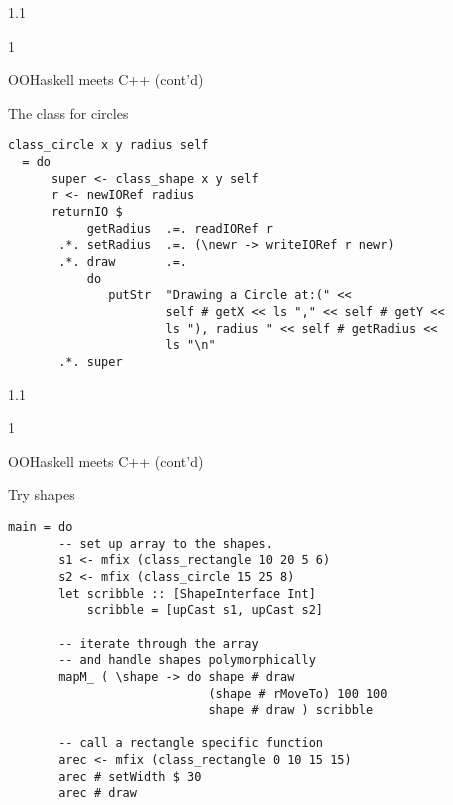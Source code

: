 \documentclass{slides}
\newenvironment{myslide}{\begin{slide}\color{Blue}\begin{boxedminipage}{1.1\hsize}\begin{boxedminipage}{1\hsize}\color{Black}
\vspace{-170\in}
}{%
\smallskip
\end{boxedminipage}
\end{boxedminipage}
\end{slide}}
\newenvironment{myslide}{\begin{slide}
}{%
\end{slide}}
\newenvironment{myslide}{\begin{slide}\color{White}\begin{boxedminipage}{1.1\hsize}\color{Black}
\vspace{-170\in}
}{%
\smallskip
\end{boxedminipage}
\end{slide}}
\newcommand{\header}[1]{{\large \color{Red} #1}}
\begin{document}
\begin{myslide}

\header{OOHaskell meets C++ (cont'd)}

The class for circles

{\tiny

\begin{verbatim}
class_circle x y radius self
  = do
      super <- class_shape x y self
      r <- newIORef radius
      returnIO $
           getRadius  .=. readIORef r
       .*. setRadius  .=. (\newr -> writeIORef r newr)
       .*. draw       .=. 
           do
              putStr  "Drawing a Circle at:(" <<
                      self # getX << ls "," << self # getY <<
                      ls "), radius " << self # getRadius <<
                      ls "\n"
       .*. super
\end{verbatim}

}

\end{myslide}






\begin{myslide}

\header{OOHaskell meets C++ (cont'd)}

Try shapes

{\tiny

\begin{verbatim}
main = do
       -- set up array to the shapes.
       s1 <- mfix (class_rectangle 10 20 5 6)
       s2 <- mfix (class_circle 15 25 8)
       let scribble :: [ShapeInterface Int]
           scribble = [upCast s1, upCast s2]
       
       -- iterate through the array
       -- and handle shapes polymorphically
       mapM_ ( \shape -> do shape # draw
                            (shape # rMoveTo) 100 100
                            shape # draw ) scribble

       -- call a rectangle specific function
       arec <- mfix (class_rectangle 0 10 15 15)
       arec # setWidth $ 30
       arec # draw
\end{verbatim}

}

\end{myslide}



\end{document}
